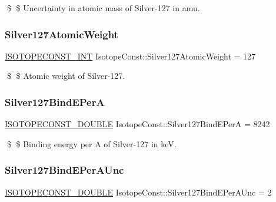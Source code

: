 \$ \$ Uncertainty in atomic mass of Silver-\/127 in amu. \mbox{\label{group___isotope_const-_silver-_ag127_ga75b469c951db19b9e0f9d27b492e00df}} 
\subsubsection{\texorpdfstring{Silver127\+Atomic\+Weight}{Silver127AtomicWeight}}
{\footnotesize\ttfamily \mbox{\hyperlink{group___isotope_const-_macros_ga5f18360b3e99483a35c32d789e62621c}{I\+S\+O\+T\+O\+P\+E\+C\+O\+N\+S\+T\+\_\+\+I\+NT}} Isotope\+Const\+::\+Silver127\+Atomic\+Weight = 127}

\$ \$ Atomic weight of Silver-\/127. \mbox{\label{group___isotope_const-_silver-_ag127_ga7616d4f6c24e903ca5dc8986c540215e}} 
\subsubsection{\texorpdfstring{Silver127\+Bind\+E\+PerA}{Silver127BindEPerA}}
{\footnotesize\ttfamily \mbox{\hyperlink{group___isotope_const-_macros_ga8f45a7272ce02c0b4c65c44636ed719a}{I\+S\+O\+T\+O\+P\+E\+C\+O\+N\+S\+T\+\_\+\+D\+O\+U\+B\+LE}} Isotope\+Const\+::\+Silver127\+Bind\+E\+PerA = 8242}

\$ \$ Binding energy per A of Silver-\/127 in keV. \mbox{\label{group___isotope_const-_silver-_ag127_gab3543b683e00f1cb4c6c284484910e8e}} 
\subsubsection{\texorpdfstring{Silver127\+Bind\+E\+Per\+A\+Unc}{Silver127BindEPerAUnc}}
{\footnotesize\ttfamily \mbox{\hyperlink{group___isotope_const-_macros_ga8f45a7272ce02c0b4c65c44636ed719a}{I\+S\+O\+T\+O\+P\+E\+C\+O\+N\+S\+T\+\_\+\+D\+O\+U\+B\+LE}} Isotope\+Const\+::\+Silver127\+Bind\+E\+Per\+A\+Unc = 2}

